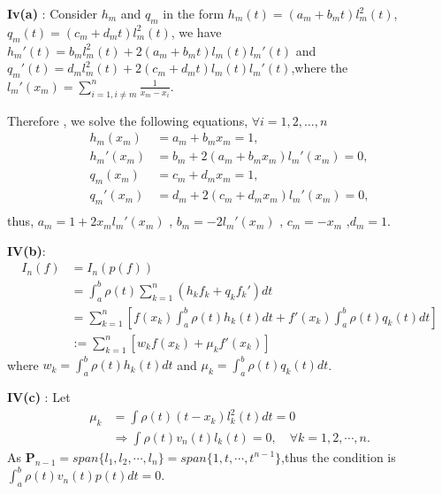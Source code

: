 \documentclass{article}
\begin{document}
\textbf{Iv(a)} : Consider $h_m$ and $q_m$ in the form $h_m(t) = (a_m + b_m t)l_m^2(t)$, $q_m(t) = (c_m + d_m t)l_m^2(t)$, we have $h_m'(t)=b_ml_m^2(t)+2(a_m+b_mt)l_m(t)l_m'(t)$ and $q_m'(t)=d_ml_m^2(t)+2(c_m+d_mt)l_m(t)l_m'(t)$,where the $l_m'(x_m)=\displaystyle\sum_{i=1,i\neq m}^n\frac{1}{x_m-x_i}$.

Therefore , we solve the following equations, $\forall i = 1,2,\dots,n$
\begin{align*}
     h_m(x_m)  & = a_m +b_mx_m  = 1 ,\\
     h_m'(x_m) & = b_m + 2(a_m+b_mx_m)l_m'(x_m)  = 0, \\
     q_m(x_m)  & = c_m +d_mx_m  = 1 ,\\
     q_m'(x_m) & = d_m + 2(c_m+d_mx_m)l_m'(x_m)  = 0 ,\\
\end{align*}
thus, $a_m = 1+ 2x_ml_m'(x_m)$ , $b_m =-2l_m'(x_m)$ , $c_m = -x_m$ ,$d_m=1$.

\textbf{IV(b)}:
\begin{align*}
    I_n(f)& =I_n(p(f))\\
    &=\int_a^b\rho(t)
    \sum_{k=1}^n(h_kf_k+q_kf_k') dt\\
    &=\sum_{k=1}^n[f(x_k)\int_a^b\rho(t)h_k(t) dt+f'(x_k)\int_a^b\rho(t)q_k(t)dt] \\
    & :=\sum_{k=1}^n[w_kf(x_k)+\mu_kf'(x_k)]
\end{align*}
where $w_k =\int_a^b\rho(t)h_k(t)dt$ and $ \mu_k =\int_a^b\rho(t)q_k(t) dt$.

\textbf{IV(c)} : Let
\begin{align*}
      \mu_k &= \int\rho(t)(t-x_k)l_k^2(t)dt = 0\\
      & \Rightarrow \int\rho(t)v_n(t)l_k(t) = 0, \quad \forall k = 1,2,\cdots,n.
\end{align*}
As $\textbf{P}_{n-1}=span\{l_1,l_2, \cdots,l_n\}=span\{1,t,\cdots,t^{n-1}\}$,thus the condition is 
$\int_a^b \rho(t)v_n(t)p(t)dt = 0.$
\end{document}
